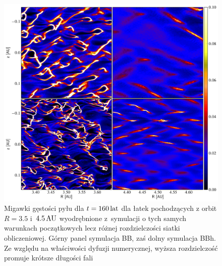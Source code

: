\begin{figure}
   \includegraphics[width=0.98\linewidth]{figures/fig10}
   \caption{Migawki gęstości pyłu dla $t = 160\hbox{$\thinspace\textrm{lat}$}$ dla łatek pochodzących z
      orbit $R=3.5$ i~$4.5\hbox{$\thinspace\textrm{AU}$}$ wyodrębnione z~symulacji o tych samych warunkach
      początkowych lecz różnej rozdzielczości siatki obliczeniowej. Górny panel
      symulacja BB, zaś dolny symulacja BBh. Ze względu na właściwości
      dyfuzji numerycznej, wyższa rozdzielczość promuje krótsze długości
      fali}
   \label{fig10} 
\end{figure}

